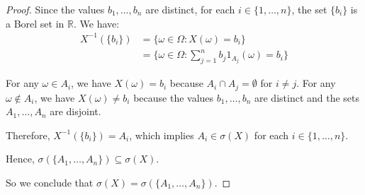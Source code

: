 \documentclass[letterpaper, 11pt]{article}
\newcommand{\1}{\mathds{1}}	%
\theoremstyle{definition}
\begin{document}
\begin{proof}
Since the values $b_1, \ldots, b_n$ are distinct, for each $i \in \{1, \ldots, n\}$, the set $\{b_i\}$ is a Borel set in $\mathbb{R}$. We have:
\begin{align*}
X^{-1}(\{b_i\}) &= \{\omega \in \Omega : X(\omega) = b_i\} \\
&= \{\omega \in \Omega : \sum_{j=1}^n b_j 1_{A_j}(\omega) = b_i\}
\end{align*}

For any $\omega \in A_i$, we have $X(\omega) = b_i$ because $A_i \cap A_j = \emptyset$ for $i \neq j$. For any $\omega \notin A_i$, we have $X(\omega) \neq b_i$ because the values $b_1, \ldots, b_n$ are distinct and the sets $A_1, \ldots, A_n$ are disjoint.

Therefore, $X^{-1}(\{b_i\}) = A_i$, which implies $A_i \in \sigma(X)$ for each $i \in \{1, \ldots, n\}$.

Hence, $\sigma(\{A_1, \ldots, A_n\}) \subseteq \sigma(X)$.

So we conclude that $\sigma(X) = \sigma(\{A_1, \ldots, A_n\})$.
    \end{proof}
\end{document}
